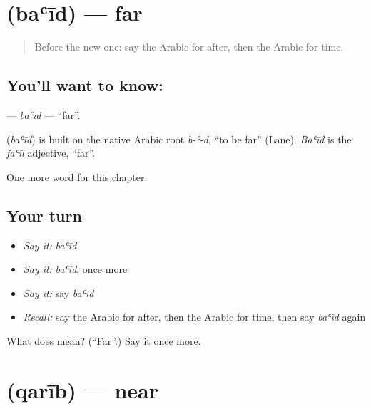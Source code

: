 \section[\texorpdfstring{\ar{بعيد} (baʿīd)}{بعيد (baʿīd)}]{ (baʿīd) — far}

\label{lesson:AR-C88-baid}



\begin{quote}
Before the new one: say the Arabic for after, then the Arabic for time.
\end{quote}

\subsection*{You'll want to know: }
\textbf{} — \emph{baʿīd} — \textquotedblleft{}far\textquotedblright{}.

\begin{cousinweb}
\textbf{} (\emph{baʿīd}) is built on the native Arabic root \emph{b-ʿ-d}, \textquotedblleft{}to be far\textquotedblright{} (Lane). \emph{Baʿīd} is the \emph{faʿīl} adjective, \textquotedblleft{}far\textquotedblright{}.
\end{cousinweb}

\begin{grammarlens}[title={What you've built}]
One more word for this chapter.
\end{grammarlens}

\subsection*{Your turn}
\begin{itemize}
\raggedright
  \item \emph{Say it:} \emph{baʿīd}
  \item \emph{Say it:} \emph{baʿīd}, once more
  \item \emph{Say it:} say \emph{baʿīd}
  \item \emph{Recall:} say the Arabic for after, then the Arabic for time, then say \emph{baʿīd} again
\end{itemize}

\begin{tcolorbox}[breakable,colback=teal!4,colframe=teal!35!black,title={Before you move on}]
What does  mean? (\textquotedblleft{}Far\textquotedblright{}.) Say it once more.
\end{tcolorbox}
\section[\texorpdfstring{\ar{قريب} (qarīb)}{قريب (qarīb)}]{ (qarīb) — near}

